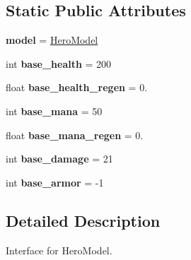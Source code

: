 \subsection*{Static Public Attributes}
\begin{DoxyCompactItemize}
\item 
{\bfseries model} = \hyperlink{classatod_1_1models_1_1hero_1_1_hero_model}{Hero\+Model}\hypertarget{classatod_1_1heroes_1_1_hero_a3a817630c0998b9f52b1cb988817498d}{}\label{classatod_1_1heroes_1_1_hero_a3a817630c0998b9f52b1cb988817498d}

\item 
int {\bfseries base\+\_\+health} = 200\hypertarget{classatod_1_1heroes_1_1_hero_a63d4617587f4729c7a55203b006a0690}{}\label{classatod_1_1heroes_1_1_hero_a63d4617587f4729c7a55203b006a0690}

\item 
float {\bfseries base\+\_\+health\+\_\+regen} = 0.\hypertarget{classatod_1_1heroes_1_1_hero_a53c412a12d44420b4d01088e0c221ab1}{}\label{classatod_1_1heroes_1_1_hero_a53c412a12d44420b4d01088e0c221ab1}

\item 
int {\bfseries base\+\_\+mana} = 50\hypertarget{classatod_1_1heroes_1_1_hero_a62e40a1aeca72d4cf09703b70486b96f}{}\label{classatod_1_1heroes_1_1_hero_a62e40a1aeca72d4cf09703b70486b96f}

\item 
float {\bfseries base\+\_\+mana\+\_\+regen} = 0.\hypertarget{classatod_1_1heroes_1_1_hero_addf105e6717aa8562ef413bd23fa1b33}{}\label{classatod_1_1heroes_1_1_hero_addf105e6717aa8562ef413bd23fa1b33}

\item 
int {\bfseries base\+\_\+damage} = 21\hypertarget{classatod_1_1heroes_1_1_hero_a2ca0e9cedc05db0dda44c0d6738b2016}{}\label{classatod_1_1heroes_1_1_hero_a2ca0e9cedc05db0dda44c0d6738b2016}

\item 
int {\bfseries base\+\_\+armor} = -\/1\hypertarget{classatod_1_1heroes_1_1_hero_ae4828f969afb8590a8df38f54fc2dc2a}{}\label{classatod_1_1heroes_1_1_hero_ae4828f969afb8590a8df38f54fc2dc2a}

\end{DoxyCompactItemize}


\subsection{Detailed Description}
\begin{DoxyVerb}Interface for HeroModel. \end{DoxyVerb}
 

